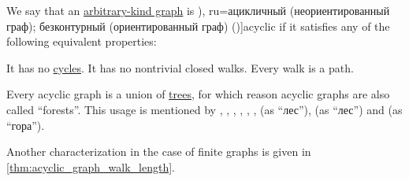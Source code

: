 \begin{definition}\label{def:acyclic_graph}
  We say that an \hyperref[rem:arbitrary_kind_graph]{arbitrary-kind graph} is \term[bg=ацикличен (ориентиран граф) (\cite[14]{Мирчев2001Графи}), ru=ацикличный (неориентированный граф); безконтурный (ориентированный граф) (\cite[280]{БелоусовТкачёв2004ДискретнаяМатематика})]{acyclic} if it satisfies any of the following equivalent properties:
  \begin{thmenum}
     It has no \hyperref[def:graph_cycle]{cycles}.
     It has no nontrivial closed walks.
     Every walk is a path.
  \end{thmenum}
\end{definition}
\begin{comments}
  \item Every acyclic graph is a union of \hyperref[def:tree]{trees}, for which reason acyclic graphs are also called \enquote{forests}. This usage is mentioned by , , , , , ,  (as \enquote{лес}),  (as \enquote{лес}) and  (as \enquote{гора}).

  \item Another characterization in the case of finite graphs is given in \cref{thm:acyclic_graph_walk_length}.
\end{comments}

